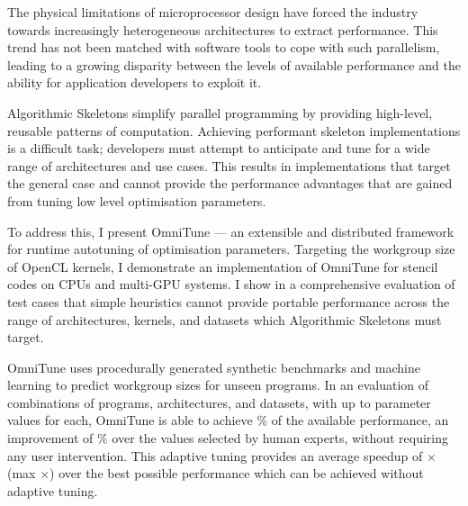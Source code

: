 The physical limitations of microprocessor design have forced the
industry towards increasingly heterogeneous architectures to extract
performance. This trend has not been matched with software tools to
cope with such parallelism, leading to a growing disparity between the
levels of available performance and the ability for application
developers to exploit it.

Algorithmic Skeletons simplify parallel programming by providing
high-level, reusable patterns of computation. Achieving performant
skeleton implementations is a difficult task; developers must attempt
to anticipate and tune for a wide range of architectures and use
cases. This results in implementations that target the general case
and cannot provide the performance advantages that are gained from
tuning low level optimisation parameters.

To address this, I present OmniTune --- an extensible and distributed
framework for runtime autotuning of optimisation parameters. Targeting
the workgroup size of OpenCL kernels, I demonstrate an implementation
of OmniTune for stencil codes on CPUs and multi-GPU systems. I show in
a comprehensive evaluation of  test cases
that simple heuristics cannot provide portable performance across the
range of architectures, kernels, and datasets which Algorithmic
Skeletons must target.

OmniTune uses procedurally generated synthetic benchmarks and machine
learning to predict workgroup sizes for unseen programs. In an
evaluation of  combinations of programs,
architectures, and datasets, with up to 
parameter values for each, OmniTune is able to achieve
$\%$ of the available
performance, an improvement of
$\%$ over the
values selected by human experts, without requiring any user
intervention. This adaptive tuning provides an average speedup of
$\times$ (max
$\times$) over the best
possible performance which can be achieved without adaptive tuning.
